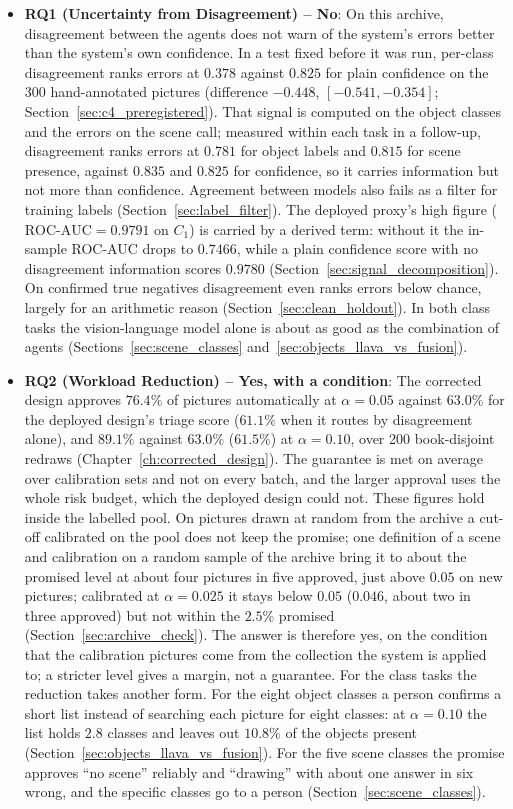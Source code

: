 \documentclass[12pt,a4paper]{report}
\begin{document}
\begin{itemize}
    \item \textbf{RQ1 (Uncertainty from Disagreement) -- No}: On this archive, disagreement between the agents does not warn of the system's errors better than the system's own confidence. In a test fixed before it was run, per-class disagreement ranks errors at $0.378$ against $0.825$ for plain confidence on the 300 hand-annotated pictures (difference $-0.448$, $[-0.541, -0.354]$; Section~\ref{sec:c4_preregistered}). That signal is computed on the object classes and the errors on the scene call; measured within each task in a follow-up, disagreement ranks errors at $0.781$ for object labels and $0.815$ for scene presence, against $0.835$ and $0.825$ for confidence, so it carries information but not more than confidence. Agreement between models also fails as a filter for training labels (Section~\ref{sec:label_filter}). The deployed proxy's high figure ($\text{ROC-AUC}=0.9791$ on $C_1$) is carried by a derived term: without it the in-sample ROC-AUC drops to $0.7466$, while a plain confidence score with no disagreement information scores $0.9780$ (Section~\ref{sec:signal_decomposition}). On confirmed true negatives disagreement even ranks errors below chance, largely for an arithmetic reason (Section~\ref{sec:clean_holdout}). In both class tasks the vision-language model alone is about as good as the combination of agents (Sections~\ref{sec:scene_classes} and~\ref{sec:objects_llava_vs_fusion}).
    \item \textbf{RQ2 (Workload Reduction) -- Yes, with a condition}: The corrected design approves $76.4\%$ of pictures automatically at $\alpha = 0.05$ against $63.0\%$ for the deployed design's triage score ($61.1\%$ when it routes by disagreement alone), and $89.1\%$ against $63.0\%$ ($61.5\%$) at $\alpha=0.10$, over 200 book-disjoint redraws (Chapter~\ref{ch:corrected_design}). The guarantee is met on average over calibration sets and not on every batch, and the larger approval uses the whole risk budget, which the deployed design could not. These figures hold inside the labelled pool. On pictures drawn at random from the archive a cut-off calibrated on the pool does not keep the promise; one definition of a scene and calibration on a random sample of the archive bring it to about the promised level at about four pictures in five approved, just above $0.05$ on new pictures; calibrated at $\alpha = 0.025$ it stays below $0.05$ ($0.046$, about two in three approved) but not within the $2.5\%$ promised (Section~\ref{sec:archive_check}). The answer is therefore yes, on the condition that the calibration pictures come from the collection the system is applied to; a stricter level gives a margin, not a guarantee. For the class tasks the reduction takes another form. For the eight object classes a person confirms a short list instead of searching each picture for eight classes: at $\alpha = 0.10$ the list holds $2.8$ classes and leaves out $10.8\%$ of the objects present (Section~\ref{sec:objects_llava_vs_fusion}). For the five scene classes the promise approves ``no scene'' reliably and ``drawing'' with about one answer in six wrong, and the specific classes go to a person (Section~\ref{sec:scene_classes}).

\end{itemize}
\end{document}
